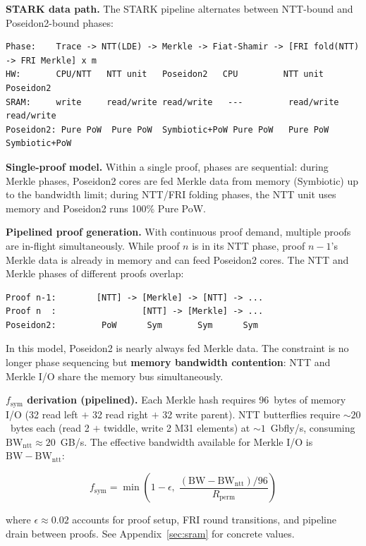 \documentclass[11pt,a4paper]{article}
\begin{document}
\textbf{STARK data path.} The STARK pipeline alternates between NTT-bound and Poseidon2-bound phases:

\begin{Verbatim}[fontsize=\small]
Phase:    Trace -> NTT(LDE) -> Merkle -> Fiat-Shamir -> [FRI fold(NTT) -> FRI Merkle] x m
HW:       CPU/NTT   NTT unit   Poseidon2   CPU         NTT unit        Poseidon2
SRAM:     write     read/write read/write   ---         read/write      read/write
Poseidon2: Pure PoW  Pure PoW  Symbiotic+PoW Pure PoW   Pure PoW       Symbiotic+PoW
\end{Verbatim}

\textbf{Single-proof model.} Within a single proof, phases are sequential: during Merkle phases, Poseidon2 cores are fed Merkle data from memory (Symbiotic) up to the bandwidth limit; during NTT/FRI folding phases, the NTT unit uses memory and Poseidon2 runs 100\% Pure PoW.

\textbf{Pipelined proof generation.} With continuous proof demand, multiple proofs are in-flight simultaneously. While proof $n$ is in its NTT phase, proof $n{-}1$'s Merkle data is already in memory and can feed Poseidon2 cores. The NTT and Merkle phases of different proofs overlap:

\begin{Verbatim}[fontsize=\small]
Proof n-1:        [NTT] -> [Merkle] -> [NTT] -> ...
Proof n  :                 [NTT] -> [Merkle] -> ...
Poseidon2:         PoW      Sym       Sym      Sym
\end{Verbatim}

In this model, Poseidon2 is nearly always fed Merkle data. The constraint is no longer phase sequencing but \textbf{memory bandwidth contention}: NTT and Merkle I/O share the memory bus simultaneously.

\textbf{$f_{\mathrm{sym}}$ derivation (pipelined).} Each Merkle hash requires 96~bytes of memory I/O (32 read left $+$ 32 read right $+$ 32 write parent). NTT butterflies require ${\sim}20$~bytes each (read 2 $+$ twiddle, write 2 M31 elements) at ${\sim}1$~Gbfly/s, consuming $\mathrm{BW}_{\mathrm{ntt}} \approx 20$~GB/s. The effective bandwidth available for Merkle I/O is $\mathrm{BW} - \mathrm{BW}_{\mathrm{ntt}}$:

$$f_{\mathrm{sym}} = \min\!\left(1 - \epsilon,\; \frac{(\mathrm{BW} - \mathrm{BW}_{\mathrm{ntt}})/96}{R_{\mathrm{perm}}}\right)$$

where $\epsilon \approx 0.02$ accounts for proof setup, FRI round transitions, and pipeline drain between proofs. See Appendix~\ref{sec:sram} for concrete values.
\end{document}
